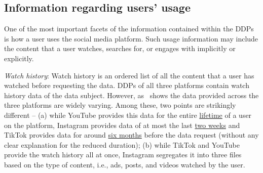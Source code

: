 \subsection{Information regarding users' usage}
\label{Sec: Usage}

One of the most important facets of the information contained within the DDPs is how a user uses the social media platform. 
Such usage information may include the content that a user watches, searches for, or engages with implicitly or explicitly.

\vspace{1 mm}
\noindent
\textit{Watch history}: Watch history is an ordered list of all the content that a user has watched before requesting the data.
DDPs of all three platforms contain watch history data of the data subject. 
However, as~ shows the data provided across the three platforms are widely varying. Among these, two points are strikingly different -- (a) while YouTube provides this data for the entire \underline{lifetime} of a user on the platform, Instagram provides data of at most the last \underline{two weeks} and TikTok provides data for around \underline{six months} before the data request (without any clear explanation for the reduced duration); (b) while TikTok and YouTube provide the watch history all at once, Instagram segregates it into three files based on the type of content, i.e., ads, posts, and videos watched by the user.


